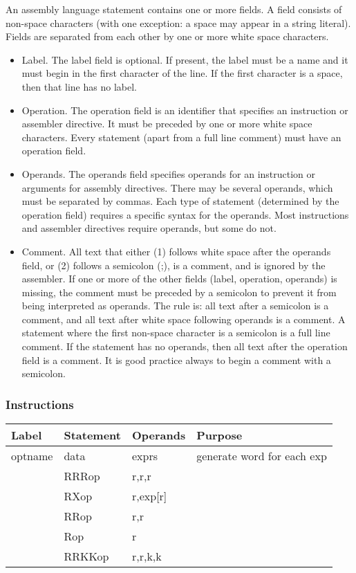 \documentclass[11pt]{article}
\begin{document}
An assembly language statement contains one or more fields.  A field
consists of non-space characters (with one exception: a space may
appear in a string literal).  Fields are separated from each other by
one or more white space characters.

\begin{itemize}
\item Label.  The label field is optional.  If present, the label must be
a name and it must begin in the first character of the line.  If the
first character is a space, then that line has no label.

\item Operation.  The operation field is an identifier that specifies an
instruction or assembler directive.  It must be preceded by one or
more white space characters.  Every statement (apart from a full
line comment) must have an operation field.

\item Operands.  The operands field specifies operands for an instruction
or arguments for assembly directives.  There may be several
operands, which must be separated by commas.  Each type of statement
(determined by the operation field) requires a specific syntax for
the operands.  Most instructions and assembler directives require
operands, but some do not.

\item Comment.  All text that either (1) follows white space after the
operands field, or (2) follows a semicolon (;), is a comment, and is
ignored by the assembler.  If one or more of the other fields
(label, operation, operands) is missing, the comment must be
preceded by a semicolon to prevent it from being interpreted as
operands.  The rule is: all text after a semicolon is a comment, and
all text after white space following operands is a comment.  A
statement where the first non-space character is a semicolon is a
full line comment.  If the statement has no operands, then all text
after the operation field is a comment.  It is good practice always
to begin a comment with a semicolon.
\end{itemize}

\subsubsection*{Instructions}
\label{sec:org06b9548}

\begin{center}
\begin{tabular}{llll}
Label & Statement & Operands & Purpose\\
\hline
optname & data & exprs & generate word for each exp\\
 & RRRop & r,r,r & \\
 & RXop & r,exp[r] & \\
 & RRop & r,r & \\
 & Rop & r & \\
 & RRKKop & r,r,k,k & \\
\end{tabular}
\end{center}
\end{document}
